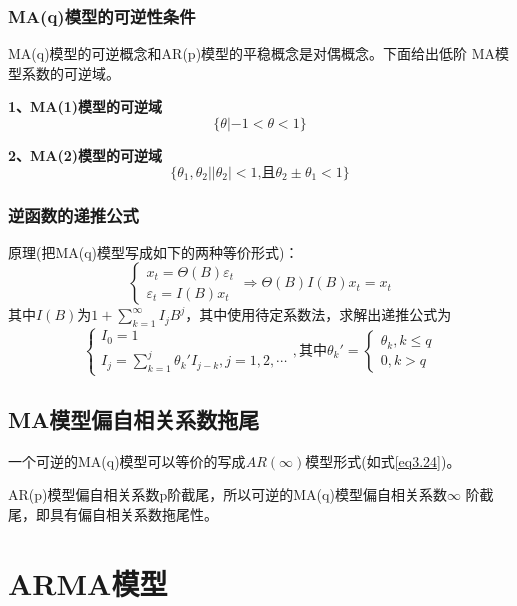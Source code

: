 \documentclass[12pt, a4paper, oneside]{ctexbook}
\begin{document}
\subsubsection{MA(q)模型的可逆性条件}
MA(q)模型的可逆概念和AR(p)模型的平稳概念是对偶概念。下面给出低阶
MA模型系数的可逆域。

\textbf{1、MA(1)模型的可逆域}
\begin{equation*}
    \{\theta|-1<\theta<1\}
\end{equation*}

\textbf{2、MA(2)模型的可逆域}
\begin{equation*}
    \{\theta_1,\theta_2||\theta_2|<1\text{,且}
    \theta_2\pm\theta_1<1\}
\end{equation*}

\subsubsection{逆函数的递推公式}
原理(把MA(q)模型写成如下的两种等价形式)：
\begin{equation*}
    \begin{cases}x_t=\Theta(B)\varepsilon_t \\
        \varepsilon_t=I(B)x_t
    \end{cases}
    \Rightarrow\Theta(B)I(B)x_t=x_t
\end{equation*}
其中$I(B)$为$1+\sum_{k=1}^{\infty}I_jB^j$，其中使用待定系数法，求解出递推公式为
\begin{equation}\label{eq3.24}
    \begin{cases}
        I_0=1 \\
        I_j=\sum_{k=1}^j\theta_k'I_{j-k},j=1,2,\cdots
    \end{cases}
    ,\text{其中}\theta_k'=
    \begin{cases}
        \theta_k,k\le q \\
        0,k>q
    \end{cases}
\end{equation}

\subsection{MA模型偏自相关系数拖尾}
一个可逆的MA(q)模型可以等价的写成$AR(\infty)$模型形式(如式\ref{eq3.24})。

AR(p)模型偏自相关系数p阶截尾，所以可逆的MA(q)模型偏自相关系数$\infty$
阶截尾，即具有偏自相关系数拖尾性。

\section{ARMA模型}
\end{document}
